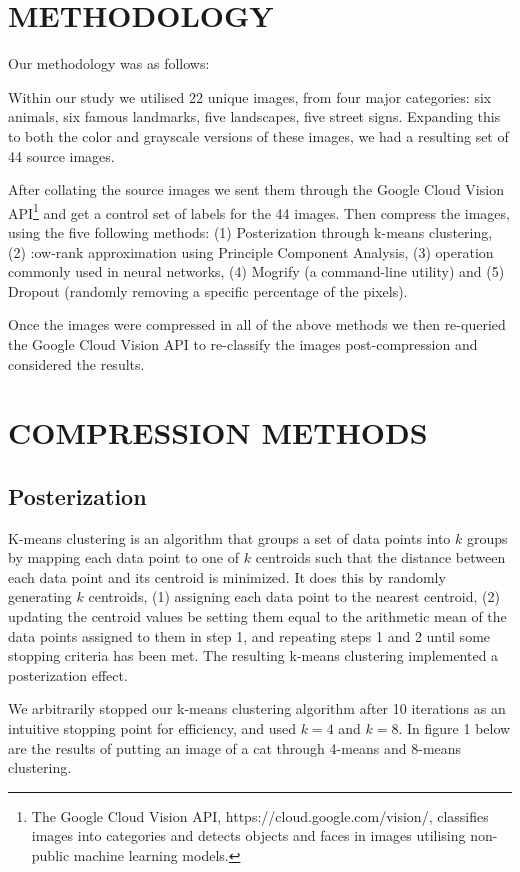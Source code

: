 \documentclass[letterpaper, 10 pt, conference]{ieeeconf}  %
\begin{document}
\section{METHODOLOGY}
Our methodology was as follows:

Within our study we utilised 22 unique images, from four major
categories: six animals, six famous landmarks, five landscapes, five
street signs. Expanding this to both the color and grayscale
versions of these images, we had a resulting set of 44 source images.

After collating the source images we sent them through the Google Cloud Vision API\footnote{The Google Cloud Vision API, https://cloud.google.com/vision/, classifies images into categories and detects objects and faces in images utilising non-public machine learning models.}
and get a control set of labels for the 44 images. Then compress the images, using the five following methods:
(1) Posterization through k-means clustering,
(2) :ow-rank approximation using Principle Component Analysis,
(3)  operation commonly used in neural networks,
(4) Mogrify (a command-line utility)
and (5) Dropout (randomly removing a specific percentage of the pixels).

Once the images were compressed in all of the above methods we then re-queried the Google Cloud Vision API to re-classify the images post-compression and considered the results.

\section{COMPRESSION METHODS}
\subsection{Posterization}
K-means clustering is an algorithm that groups
a set of data points into $k$ groups by mapping each data point
to one of $k$ centroids such that the distance between each data point
and its centroid is minimized. It does this by randomly generating $k$
centroids, (1) assigning each data point to the nearest centroid,
(2) updating the centroid values be setting them equal to the arithmetic
mean of the data points assigned to them in step 1, and repeating steps
1 and 2 until some stopping criteria has been met. The resulting k-means clustering implemented a posterization
effect.

We arbitrarily stopped our k-means clustering algorithm after 10 iterations as an intuitive stopping point for efficiency, and used $k=4$ and $k=8$. In figure 1 below are the results of putting an image of a cat through 4-means and 8-means
clustering.
\end{document}
